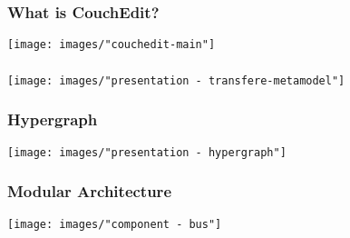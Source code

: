\begin{frame}
  \frametitle{What is CouchEdit?}
  \hspace{-1.5cm}
  \centering
  \texttt{[image: images/"couchedit-main"]}
\end{frame}

\begin{frame}
  \frametitle{}
  \hspace{-1.5cm}
  \centering
  \texttt{[image: images/"presentation - transfere-metamodel"]}
\end{frame}


\begin{frame}
  \frametitle{Hypergraph}
  \hspace{-1cm}
  \centering
  \texttt{[image: images/"presentation - hypergraph"]}
\end{frame}

\begin{frame}
  \frametitle{Modular Architecture}
  \hspace{-1cm}
  \centering
  \texttt{[image: images/"component - bus"]}
\end{frame}